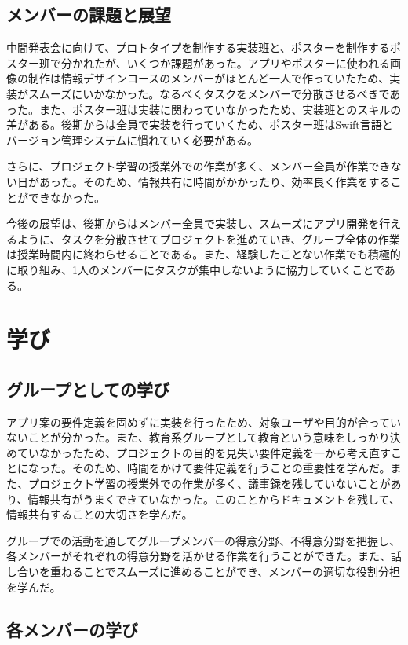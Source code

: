 \documentclass[openany,11pt,papersize]{jsbook}
\begin{document}
\section{メンバーの課題と展望}
中間発表会に向けて、プロトタイプを制作する実装班と、ポスターを制作するポスター班で分かれたが、いくつか課題があった。アプリやポスターに使われる画像の制作は情報デザインコースのメンバーがほとんど一人で作っていたため、実装がスムーズにいかなかった。なるべくタスクをメンバーで分散させるべきであった。また、ポスター班は実装に関わっていなかったため、実装班とのスキルの差がある。後期からは全員で実装を行っていくため、ポスター班はSwift言語とバージョン管理システムに慣れていく必要がある。
\par
さらに、プロジェクト学習の授業外での作業が多く、メンバー全員が作業できない日があった。そのため、情報共有に時間がかかったり、効率良く作業をすることができなかった。
\par
今後の展望は、後期からはメンバー全員で実装し、スムーズにアプリ開発を行えるように、タスクを分散させてプロジェクトを進めていき、グループ全体の作業は授業時間内に終わらせることである。また、経験したことない作業でも積極的に取り組み、1人のメンバーにタスクが集中しないように協力していくことである。


\chapter{学び}
\section{グループとしての学び}
アプリ案の要件定義を固めずに実装を行ったため、対象ユーザや目的が合っていないことが分かった。また、教育系グループとして教育という意味をしっかり決めていなかったため、プロジェクトの目的を見失い要件定義を一から考え直すことになった。そのため、時間をかけて要件定義を行うことの重要性を学んだ。また、プロジェクト学習の授業外での作業が多く、議事録を残していないことがあり、情報共有がうまくできていなかった。このことからドキュメントを残して、情報共有することの大切さを学んだ。
\par
グループでの活動を通してグループメンバーの得意分野、不得意分野を把握し、各メンバーがそれぞれの得意分野を活かせる作業を行うことができた。また、話し合いを重ねることでスムーズに進めることができ、メンバーの適切な役割分担を学んだ。

\section{各メンバーの学び}
\end{document}
